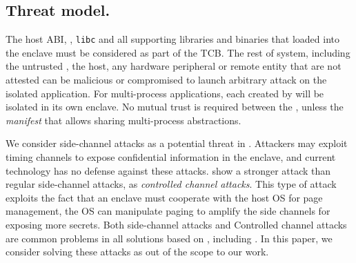 \subsection{Threat model.}
\label{sec:gsgx:overview:threat}

The host ABI, \libos{}, {\tt libc} and all supporting libraries and binaries
that loaded into the enclave
must be considered as part of the TCB.
The rest of system, including the untrusted \pal{}, the host, any hardware peripheral or remote entity that are not attested
can be malicious or compromised
to launch arbitrary attack on the isolated application.
For multi-process applications, each \picoproc{} created by \sysname{}
will be isolated in its own enclave.
No mutual trust is required between the \picoprocs{},
unless the {\em manifest}
that allows sharing multi-process abstractions.

We consider side-channel attacks as a potential threat in \sysname{}.
Attackers may exploit timing channels to expose confidential
information in the enclave, and current \sgx{} technology has no defense
against these attacks.
\cite{xu15controlledchannel} show a stronger attack than regular side-channel attacks, as {\em controlled channel attacks}.
This type of attack exploits the fact that an enclave must cooperate
with the host OS for page management,
the OS can manipulate paging to amplify the side channels
for exposing more secrets.
Both side-channel attacks and Controlled channel attacks
are common problems in all solutions based on \sgx{},
including \haven{}. In this paper, we consider solving these attacks as
out of the scope to our work.

